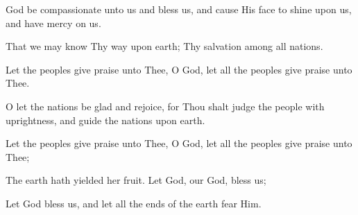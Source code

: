 God be compassionate unto us and bless us, and cause His face to shine upon us, and have mercy on us.

That we may know Thy way upon earth; Thy salvation among all nations.

Let the peoples give praise unto Thee, O God, let all the peoples give praise unto Thee.

O let the nations be glad and rejoice, for Thou shalt judge the people with uprightness, and guide the nations upon earth.

Let the peoples give praise unto Thee, O God, let all the peoples give praise unto Thee;

The earth hath yielded her fruit. Let God, our God, bless us;

Let God bless us, and let all the ends of the earth fear Him.
